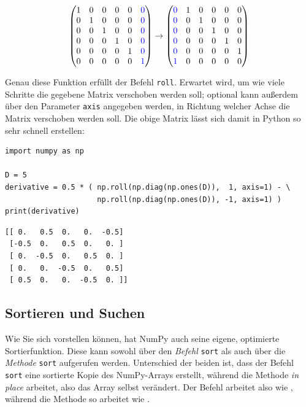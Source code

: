 \[\begin{pmatrix}
   1 &  0 &  0 &  0 &  0  &  \color{blue}0 \\
   0 &  1 &  0 &  0 &  0  &  \color{blue}0 \\
   0 &  0 &  1 &  0 &  0  &  \color{blue}0 \\
   0 &  0 &  0 &  1 &  0  &  \color{blue}0 \\
   0 &  0 &  0 &  0 &  1  &  \color{blue}0 \\
   0 &  0 &  0 &  0 &  0  &  \color{blue}1 \\
\end{pmatrix}
\rightarrow
\begin{pmatrix}
   \color{blue} 0 &  1 &  0 &  0 &  0 &  0 \\
   \color{blue} 0 &  0 &  1 &  0 &  0 &  0 \\
   \color{blue} 0 &  0 &  0 &  1 &  0 &  0 \\
   \color{blue} 0 &  0 &  0 &  0 &  1 &  0 \\
   \color{blue} 0 &  0 &  0 &  0 &  0 &  1 \\
   \color{blue} 1 &  0 &  0 &  0 &  0 &  0 \\
\end{pmatrix}
\]

Genau diese Funktion erfüllt der Befehl \texttt{roll}. Erwartet wird, um wie viele Schritte die gegebene Matrix verschoben werden soll; optional kann außerdem über den Parameter \texttt{axis} angegeben werden, in Richtung welcher Achse die Matrix verschoben werden soll. Die obige Matrix lässt sich damit in Python so sehr schnell erstellen:

\begin{codebox}
\begin{verbatim}
import numpy as np

D = 5
derivative = 0.5 * ( np.roll(np.diag(np.ones(D)),  1, axis=1) - \
                     np.roll(np.diag(np.ones(D)), -1, axis=1) )
print(derivative)
\end{verbatim}
\end{codebox}
%
\begin{cmdbox}
\begin{verbatim}
[[ 0.   0.5  0.   0.  -0.5]
 [-0.5  0.   0.5  0.   0. ]
 [ 0.  -0.5  0.   0.5  0. ]
 [ 0.   0.  -0.5  0.   0.5]
 [ 0.5  0.   0.  -0.5  0. ]]
\end{verbatim}
\end{cmdbox}

\subsection{Sortieren und Suchen}
Wie Sie sich vorstellen können, hat NumPy auch seine eigene, optimierte Sortierfunktion. Diese kann sowohl über den \emph{Befehl} \texttt{sort} als auch über die \emph{Methode} \texttt{sort} aufgerufen werden. Unterschied der beiden ist, dass der Befehl \texttt{sort} eine sortierte Kopie des NumPy-Arrays erstellt, während die Methode \emph{in place} arbeitet, also das Array selbst verändert. Der Befehl arbeitet also wie , während die Methode so arbeitet wie .

